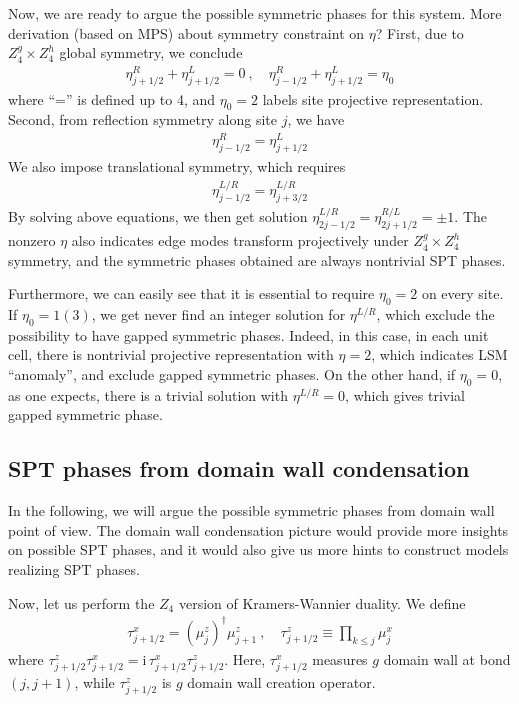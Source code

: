 \documentclass[reprint,amsmath,amssymb,aps,pra,]{revtex4-1}
\newcommand{\ii}{\mathrm{i}\,} %
\newcommand{\dg}{\dagger}
\begin{document}
Now, we are ready to argue the possible symmetric phases for this system.
{\color{red} More derivation (based on MPS) about symmetry constraint on $\eta$?}
First, due to $Z_4^g\times Z_4^h$ global symmetry, we conclude
\begin{align}
  \eta^R_{j+1/2}+\eta^L_{j+1/2}=0~,\quad \eta^R_{j-1/2}+\eta^L_{j+1/2}=\eta_0
  \label{}
\end{align}
where ``='' is defined up to 4, and $\eta_0=2$ labels site projective representation.
Second, from reflection symmetry along site $j$, we have 
\begin{align}
  \eta^R_{j-1/2}=\eta^L_{j+1/2}
  \label{}
\end{align}
We also impose translational symmetry, which requires
\begin{align}
  \eta^{L/R}_{j-1/2}=\eta^{L/R}_{j+3/2}
  \label{}
\end{align}
By solving above equations, we then get solution $\eta^{L/R}_{2j-1/2}=\eta^{R/L}_{2j+1/2}=\pm1$.
The nonzero $\eta$ also indicates edge modes transform projectively under $Z_4^g\times Z_4^h$ symmetry, and the symmetric phases obtained are always nontrivial SPT phases.

Furthermore, we can easily see that it is essential to require $\eta_0=2$ on every site.
If $\eta_0=1(3)$, we get never find an integer solution for $\eta^{L/R}$, which exclude the possibility to have gapped symmetric phases.
Indeed, in this case, in each unit cell, there is nontrivial projective representation with $\eta=2$, which indicates LSM ``anomaly'', and exclude gapped symmetric phases.
On the other hand, if $\eta_0=0$, as one expects, there is a trivial solution with $\eta^{L/R}=0$, which gives trivial gapped symmetric phase.

\subsection{SPT phases from domain wall condensation}
In the following, we will argue the possible symmetric phases from domain wall point of view.
The domain wall condensation picture would provide more insights on possible SPT phases, and it would also give us more hints to construct models realizing SPT phases.

Now, let us perform the $Z_4$ version of Kramers-Wannier duality. We define
\begin{align}
  \tau^x_{j+1/2}=(\mu^z_j)^\dg\mu^z_{j+1}~,\quad \tau^z_{j+1/2}\equiv\prod_{k\le j}\mu^x_j
  \label{eq:z4_dw_duality}
\end{align}
where $\tau^z_{j+1/2}\tau^x_{j+1/2}=\ii \tau^x_{j+1/2}\tau^z_{j+1/2}$.
Here, $\tau^x_{j+1/2}$ measures $g$ domain wall at bond $(j,j+1)$, while $\tau^z_{j+1/2}$ is $g$ domain wall creation operator.
\end{document}
